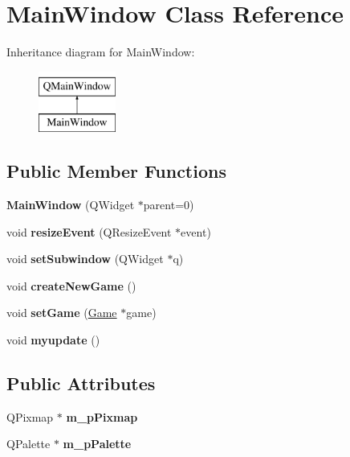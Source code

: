 \hypertarget{classMainWindow}{}\section{Main\+Window Class Reference}
\label{classMainWindow}
Inheritance diagram for Main\+Window\+:\begin{figure}[H]
\begin{center}
\leavevmode
\includegraphics[height=2.000000cm]{classMainWindow}
\end{center}
\end{figure}
\subsection*{Public Member Functions}
\begin{DoxyCompactItemize}
\item 
\mbox{\label{classMainWindow_a8b244be8b7b7db1b08de2a2acb9409db}} 
{\bfseries Main\+Window} (Q\+Widget $\ast$parent=0)
\item 
\mbox{\label{classMainWindow_ae12f8f63791595567b6250f8bb002bda}} 
void {\bfseries resize\+Event} (Q\+Resize\+Event $\ast$event)
\item 
\mbox{\label{classMainWindow_a889d39caf6b396921d972800e2fba819}} 
void {\bfseries set\+Subwindow} (Q\+Widget $\ast$q)
\item 
\mbox{\label{classMainWindow_aa8bd15bfe653d4a823453aa2de06b807}} 
void {\bfseries create\+New\+Game} ()
\item 
\mbox{\label{classMainWindow_a33c0c4b08a759f5c32446d284a811947}} 
void {\bfseries set\+Game} (\hyperlink{classGame}{Game} $\ast$game)
\item 
\mbox{\label{classMainWindow_aa78b3f5e5a1226396581fde03f7f1172}} 
void {\bfseries myupdate} ()
\end{DoxyCompactItemize}
\subsection*{Public Attributes}
\begin{DoxyCompactItemize}
\item 
\mbox{\label{classMainWindow_a0df1000428a75f4b5ca749b84f1f4a28}} 
Q\+Pixmap $\ast$ {\bfseries m\+\_\+p\+Pixmap}
\item 
\mbox{\label{classMainWindow_a4687ca985e01079dd109899fa997b5ef}} 
Q\+Palette $\ast$ {\bfseries m\+\_\+p\+Palette}
\end{DoxyCompactItemize}


